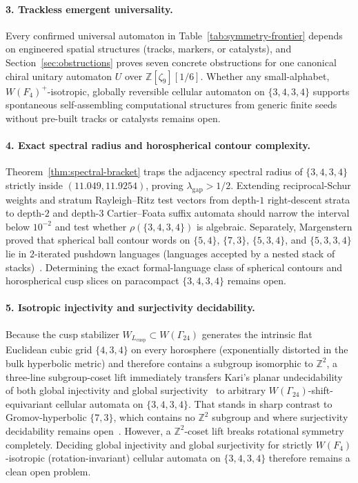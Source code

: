 \paragraph{3. Trackless emergent universality.}
Every confirmed universal automaton in Table~\ref{tab:symmetry-frontier} depends on engineered spatial structures (tracks, markers, or catalysts), and Section~\ref{sec:obstructions} proves seven concrete obstructions for one canonical chiral unitary automaton $U$ over $\mathbb{Z}[\zeta_9][1/6]$. Whether any small-alphabet, $W(F_4)^+$-isotropic, globally reversible cellular automaton on $\{3,4,3,4\}$ supports spontaneous self-assembling computational structures from generic finite seeds without pre-built tracks or catalysts remains open.

\paragraph{4. Exact spectral radius and horospherical contour complexity.}
Theorem~\ref{thm:spectral-bracket} traps the adjacency spectral radius of $\{3,4,3,4\}$ strictly inside $(11.049, 11.9254)$, proving $\lambda_{\mathrm{gap}} > 1/2$. Extending reciprocal-Schur weights and stratum Rayleigh--Ritz test vectors from depth-$1$ right-descent strata to depth-$2$ and depth-$3$ Cartier--Foata suffix automata should narrow the interval below $10^{-2}$ and test whether $\rho(\{3,4,3,4\})$ is algebraic. Separately, Margenstern proved that spherical ball contour words on $\{5,4\}$, $\{7,3\}$, $\{5,3,4\}$, and $\{5,3,3,4\}$ lie in $2$-iterated pushdown languages (languages accepted by a nested stack of stacks)~\cite{margenstern2009contour}. Determining the exact formal-language class of spherical contours and horospherical cusp slices on paracompact $\{3,4,3,4\}$ remains open.

\paragraph{5. Isotropic injectivity and surjectivity decidability.}
Because the cusp stabilizer $W_{L_{\mathrm{cusp}}} \subset W(\Gamma_{24})$ generates the intrinsic flat Euclidean cubic grid $\{4,3,4\}$ on every horosphere (exponentially distorted in the bulk hyperbolic metric) and therefore contains a subgroup isomorphic to $\mathbb{Z}^2$, a three-line subgroup-coset lift immediately transfers Kari's planar undecidability of both global injectivity and global surjectivity~\cite{kari1994} to arbitrary $W(\Gamma_{24})$-shift-equivariant cellular automata on $\{3,4,3,4\}$. That stands in sharp contrast to Gromov-hyperbolic $\{7,3\}$, which contains no $\mathbb{Z}^2$ subgroup and where surjectivity decidability remains open~\cite{margenstern2008injectivity}. However, a $\mathbb{Z}^2$-coset lift breaks rotational symmetry completely. Deciding global injectivity and global surjectivity for strictly $W(F_4)$-isotropic (rotation-invariant) cellular automata on $\{3,4,3,4\}$ therefore remains a clean open problem.


